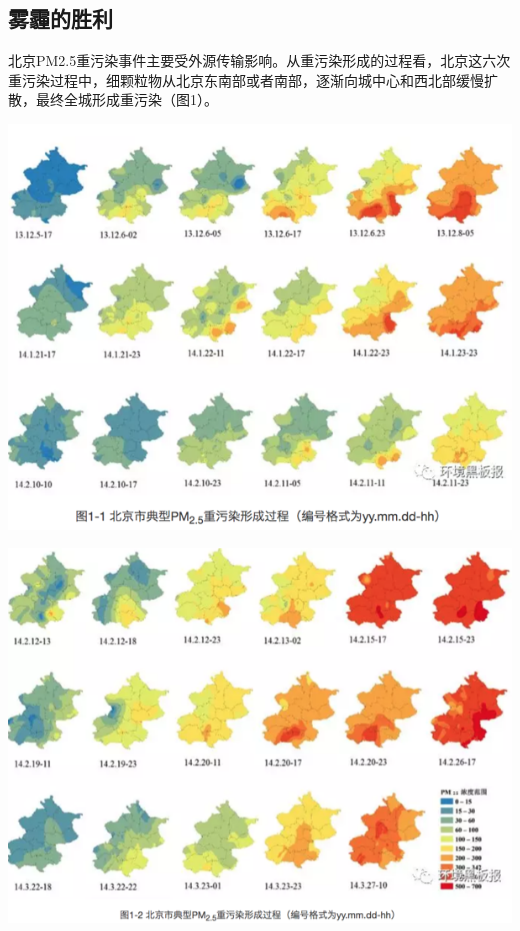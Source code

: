 \documentclass[
]{book}
\begin{document}
\hypertarget{ux96feux973eux7684ux80dcux5229}{%
\subsection{雾霾的胜利}\label{ux96feux973eux7684ux80dcux5229}}

北京PM2.5重污染事件主要受外源传输影响。从重污染形成的过程看，北京这六次重污染过程中，细颗粒物从北京东南部或者南部，逐渐向城中心和西北部缓慢扩散，最终全城形成重污染（图1）。

\includegraphics[width=8.33in]{images/windhaze1}

\includegraphics[width=8.33in]{images/windhaze2}
\end{document}
